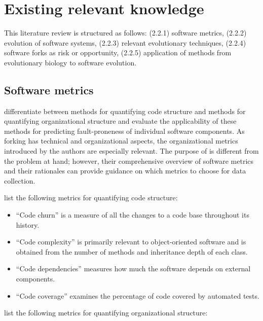 \section{Existing relevant knowledge}

This literature review is structured as follows: (2.2.1) software metrics, (2.2.2) evolution of software systems, (2.2.3) relevant evolutionary techniques, (2.2.4) software forks as risk or opportunity, (2.2.5) application of methods from evolutionary biology to software evolution.

\subsection{Software metrics}
\label{software_metrics}

\citet{Nagappan2008a} differentiate between methods for quantifying code structure and methods for quantifying organizational structure and evaluate the applicability of these methods for predicting fault-proneness of individual software components. As forking has technical and organizational aspects, the organizational metrics introduced by the authors are especially relevant. The purpose of \citet{Nagappan2008a} is different from the problem at hand; however, their comprehensive overview of software metrics and their rationales can provide guidance on which metrics to choose for data collection.

\noindent
\citet{Nagappan2008a} list the following metrics for quantifying code structure:

\begin{itemize}
  \item{“Code churn” is a measure of all the changes to a code base throughout its history.}
  \item{“Code complexity” is primarily relevant to object-oriented software and is obtained from the number of methods and inheritance depth of each class.}
  \item{“Code dependencies” measures how much the software depends on external components.}
  \item{“Code coverage” examines the percentage of code covered by automated tests.}
\end{itemize}

\noindent
\citet{Nagappan2008a} list the following metrics for quantifying organizational structure:

